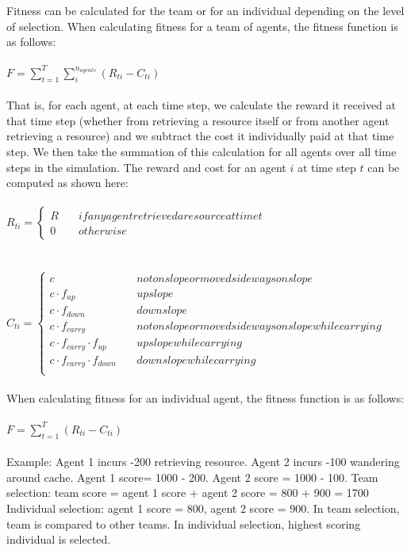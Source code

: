\documentclass[12pt]{article}  %
\begin{document}
Fitness can be calculated for the team or for an individual depending on the level of selection.
When calculating fitness for a team of agents, the fitness function is as follows:\\ 
\\
$F = \sum_{t=1}^{T} \sum_{i}^{n_{agents}} (R_{ti} - C_{ti}) $\\
\\
That is, for each agent, at each time step, we calculate the reward it received at that time step (whether from retrieving a resource itself or from another agent retrieving a resource) and we subtract the cost it individually paid at that time step. 
We then take the summation of this calculation for all agents over all time steps in the simulation.
The reward and cost for an agent $i$ at time step $t$ can be computed as shown here:\\
\\
$
R_{ti} = \left\{
        \begin{array}{ll}
            R & \quad if any agent retrieved a resource at time t \\
            0 & \quad otherwise
        \end{array}
    \right.
$
\\
\\
\\
$
C_{ti} = \left\{
        \begin{array}{ll}
            c & \quad not on slope or moved sideways on slope\\
            c \cdot f_{up} & \quad up slope\\
            c \cdot f_{down} & \quad down slope\\
            c \cdot f_{carry} & \quad not on slope or moved sideways on slope while carrying\\
            c \cdot f_{carry} \cdot f_{up} & \quad up slope while carrying \\
            c \cdot f_{carry} \cdot f_{down} & \quad down slope while carrying\\
        \end{array}
    \right.
$
\\
\\
When calculating fitness for an individual agent, the fitness function is as follows:\\
\\
$F = \sum_{t=1}^{T} (R_{ti} - C_{ti}) $
\\
\\
Example: Agent 1 incurs -200 retrieving resource. 
Agent 2 incurs -100 wandering around cache. 
Agent 1 score= 1000 - 200. 
Agent 2 score = 1000 - 100.
Team selection: team score = agent 1 score + agent 2 score = 800 + 900 = 1700
Individual selection: agent 1 score = 800, agent 2 score = 900. 
In team selection, team is compared to other teams. 
In individual selection, highest scoring individual is selected. 
\end{document}
